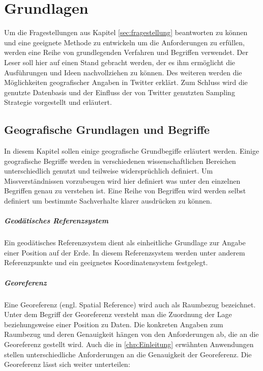 \chapter{Grundlagen} 
Um die Fragestellungen aus Kapitel \ref{sec:fragestellung} beantworten zu können und eine geeignete Methode zu entwickeln um die Anforderungen zu erfüllen, werden eine Reihe von grundlegenden Verfahren und Begriffen verwendet. 
Der Leser soll hier auf einen Stand gebracht werden, der es ihm ermöglicht die Ausführungen und Ideen nachvollziehen zu können.  
Des weiteren werden die Möglichkeiten geografischer Angaben in Twitter erklärt.
Zum Schluss wird die genutzte Datenbasis und der Einfluss der von Twitter genutzten Sampling Strategie vorgestellt und erläutert.

\newpage

	\section{Geografische Grundlagen und Begriffe}
	In diesem Kapitel sollen einige geografische Grundbegiffe erläutert werden. 
	Einige geografische Begriffe werden in verschiedenen wissenschaftlichen Bereichen unterschiedlich genutzt und teilweise widersprüchlich definiert. 
	Um Missverständnissen vorzubeugen wird hier definiert was unter den einzelnen Begriffen genau zu verstehen ist.
	Eine Reihe von Begriffen wird werden selbst definiert um bestimmte Sachverhalte klarer ausdrücken zu können. 

		\paragraph*{Geodätisches Referenzsystem} 
		Ein geodätisches Referenzsystem dient als einheitliche Grundlage zur Angabe einer Position auf der Erde. 
		In diesem Referenzsystem werden unter anderem Referenzpunkte und ein geeignetes Koordinatensystem festgelegt.  
		
		\paragraph{Georeferenz}
		Eine Georeferenz (engl. Spatial Reference) wird auch als Raumbezug bezeichnet. 
		Unter dem Begriff der Georeferenz versteht man die Zuordnung der Lage beziehungsweise einer Position zu Daten. 
		Die konkreten Angaben zum Raumbezug und deren Genauigkeit hängen von den Anforderungen ab, die an die Georeferenz gestellt wird. 
		Auch die in \ref{chp:Einleitung} erwähnten Anwendungen stellen unterschiedliche Anforderungen an die Genauigkeit der Georeferenz.
		Die Georeferenz lässt sich weiter unterteilen:
		
